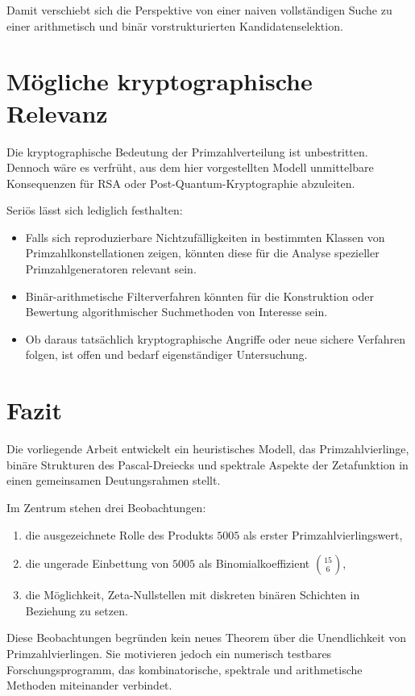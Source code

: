 \documentclass[11pt,a4paper,twocolumn]{article}
\theoremstyle{definition}
\theoremstyle{remark}
\begin{document}
	Damit verschiebt sich die Perspektive von einer naiven vollständigen Suche zu einer arithmetisch und binär vorstrukturierten Kandidatenselektion.
	
	\section{Mögliche kryptographische Relevanz}
	Die kryptographische Bedeutung der Primzahlverteilung ist unbestritten. Dennoch wäre es verfrüht, aus dem hier vorgestellten Modell unmittelbare Konsequenzen für RSA oder Post-Quantum-Kryptographie abzuleiten.
	
	Seriös lässt sich lediglich festhalten:
	\begin{itemize}
		\item Falls sich reproduzierbare Nichtzufälligkeiten in bestimmten Klassen von Primzahlkonstellationen zeigen, könnten diese für die Analyse spezieller Primzahlgeneratoren relevant sein.
		\item Binär-arithmetische Filterverfahren könnten für die Konstruktion oder Bewertung algorithmischer Suchmethoden von Interesse sein.
		\item Ob daraus tatsächlich kryptographische Angriffe oder neue sichere Verfahren folgen, ist offen und bedarf eigenständiger Untersuchung.
	\end{itemize}
	
	\section{Fazit}
	Die vorliegende Arbeit entwickelt ein heuristisches Modell, das Primzahlvierlinge, binäre Strukturen des Pascal-Dreiecks und spektrale Aspekte der Zetafunktion in einen gemeinsamen Deutungsrahmen stellt.
	
	Im Zentrum stehen drei Beobachtungen:
	\begin{enumerate}
		\item die ausgezeichnete Rolle des Produkts $5005$ als erster Primzahlvierlingswert,
		\item die ungerade Einbettung von $5005$ als Binomialkoeffizient $\binom{15}{6}$,
		\item die Möglichkeit, Zeta-Nullstellen mit diskreten binären Schichten in Beziehung zu setzen.
	\end{enumerate}
	
	Diese Beobachtungen begründen kein neues Theorem über die Unendlichkeit von Primzahlvierlingen. Sie motivieren jedoch ein numerisch testbares Forschungsprogramm, das kombinatorische, spektrale und arithmetische Methoden miteinander verbindet.
	
\end{document}
